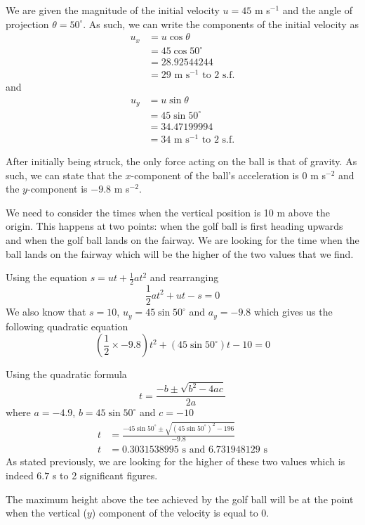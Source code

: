 \documentclass[a4paper,12pt]{article}
\numberwithin{equation}{section}
\begin{document}
\begin{question}

\qpart

\qsubpart
We are given the magnitude of the initial velocity $u = 45$ m s$^{-1}$ and the angle of projection $\theta = 50^{\circ}$. As such, we can write the components of the initial velocity as
\begin{align*}
u_x &= u\cos\theta\\
&= 45\cos50^\circ\\
&=28.92544244\\
&=29\text{ m s}^{-1}\text{ to 2 s.f.}
\end{align*}
and
\begin{align*}
u_y &= u\sin\theta\\
&= 45\sin50^\circ\\
&=34.47199994\\
&=34\text{ m s}^{-1}\text{ to 2 s.f.}
\end{align*}

\qsubpart
After initially being struck, the only force acting on the ball is that of gravity. As such, we can state that the $x$-component of the ball's acceleration is $0$ m s$^{-2}$ and the $y$-component is $-9.8$ m s$^{-2}$.

\qpart

\qsubpart
We need to consider the times when the vertical position is 10 m above the origin. This happens at two points: when the golf ball is first heading upwards and when the golf ball lands on the fairway. We are looking for the time when the ball lands on the fairway which will be the higher of the two values that we find.

Using the equation $s=ut+\frac{1}{2}at^2$ and rearranging
\[
\frac{1}{2}at^2+ut-s=0
\]
We also know that $s=10$, $u_y=45\sin50^\circ$ and $a_y=-9.8$ which gives us the following quadratic equation
\[
(\frac{1}{2}\times-9.8)t^2+(45\sin50^\circ)t - 10 = 0
\]

\newpage
Using the quadratic formula
\[
t = \frac{-b\pm\sqrt{b^2-4ac}}{2a}
\]
where $a = -4.9$, $b = 45\sin50^\circ$ and $c = -10$
\begin{align*}
t&=\frac{-45\sin50^\circ\pm\sqrt{(45\sin50^\circ)^2-196}}{-9.8}\\
t&=0.3031538995\text{ s and }6.731948129\text{ s}
\end{align*}
As stated previously, we are looking for the higher of these two values which is indeed $6.7$ s to 2 significant figures.

\qsubpart
The maximum height above the tee achieved by the golf ball will be at the point when the vertical ($y$) component of the velocity is equal to $0$.


\end{question}
\end{document}
